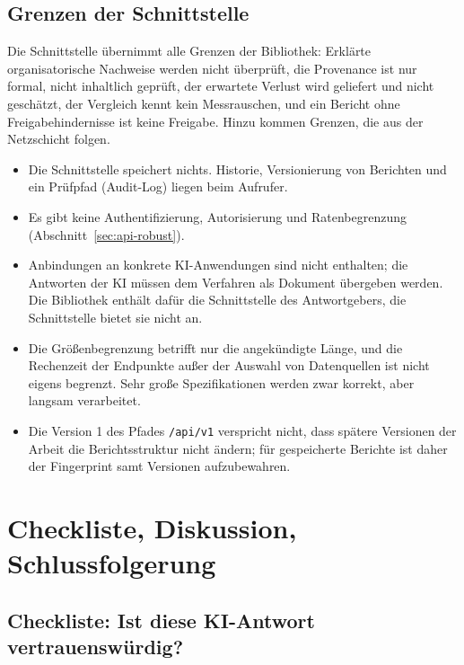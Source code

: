 \documentclass[a4paper,12pt]{article}
\theoremstyle{definition}
\begin{document}
\subsection{Grenzen der Schnittstelle}
\label{sec:api-limits}
Die Schnittstelle übernimmt alle Grenzen der Bibliothek: Erklärte organisatorische Nachweise werden nicht überprüft, die Provenance ist nur formal, nicht inhaltlich geprüft, der erwartete Verlust wird geliefert und nicht geschätzt, der Vergleich kennt kein Messrauschen, und ein Bericht ohne Freigabehindernisse ist keine Freigabe. Hinzu kommen Grenzen, die aus der Netzschicht folgen.
\begin{itemize}
\item Die Schnittstelle speichert nichts. Historie, Versionierung von Berichten und ein Prüfpfad (Audit-Log) liegen beim Aufrufer.
\item Es gibt keine Authentifizierung, Autorisierung und Ratenbegrenzung (Abschnitt~\ref{sec:api-robust}).
\item Anbindungen an konkrete KI-Anwendungen sind nicht enthalten; die Antworten der KI müssen dem Verfahren als Dokument übergeben werden. Die Bibliothek enthält dafür die Schnittstelle des Antwortgebers, die Schnittstelle bietet sie nicht an.
\item Die Größenbegrenzung betrifft nur die angekündigte Länge, und die Rechenzeit der Endpunkte außer der Auswahl von Datenquellen ist nicht eigens begrenzt. Sehr große Spezifikationen werden zwar korrekt, aber langsam verarbeitet.
\item Die Version 1 des Pfades \texttt{/api/v1} verspricht nicht, dass spätere Versionen der Arbeit die Berichtsstruktur nicht ändern; für gespeicherte Berichte ist daher der Fingerprint samt Versionen aufzubewahren.
\end{itemize}

\FloatBarrier

\section{Checkliste, Diskussion, Schlussfolgerung}

\subsection{Checkliste: Ist diese KI-Antwort vertrauenswürdig?}
\label{sec:checklist}
\end{document}
